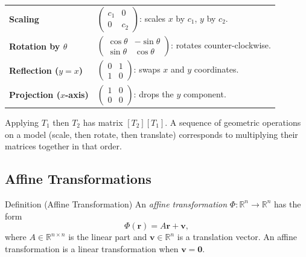 \begin{tcolorbox}[colback=gray!6, colframe=gray!40, arc=2pt,
  left=6pt, right=6pt, top=4pt, bottom=4pt,
  title={\small\textbf{Standard Planar Transformations}},
  fonttitle=\small\bfseries]
\begin{tabular}{@{}p{}p{}@{}}
\textbf{Scaling}           & $\begin{pmatrix} c_1 & 0 \\ 0 & c_2 \end{pmatrix}$: scales $x$ by $c_1$, $y$ by $c_2$. \\[8pt]
\textbf{Rotation by $\theta$} & $\begin{pmatrix} \cos\theta & -\sin\theta \\ \sin\theta & \cos\theta \end{pmatrix}$: rotates counter-clockwise. \\[8pt]
\textbf{Reflection ($y=x$)} & $\begin{pmatrix} 0 & 1 \\ 1 & 0 \end{pmatrix}$: swaps $x$ and $y$ coordinates. \\[8pt]
\textbf{Projection ($x$-axis)} & $\begin{pmatrix} 1 & 0 \\ 0 & 0 \end{pmatrix}$: drops the $y$ component. \\
\end{tabular}
\end{tcolorbox}

\begin{remark*}
Applying $T_1$ then $T_2$ has matrix $[T_2][T_1]$.
A sequence of geometric operations on a model (scale, then rotate, then translate)
corresponds to multiplying their matrices together in that order.
\end{remark*}

\subsection*{Affine Transformations}

\begin{propositionbox}{Definition (Affine Transformation)}
An \emph{affine transformation} $\Phi : \mathbb{R}^n \to \mathbb{R}^n$ has the form
\[
  \Phi(\mathbf{r}) = A\mathbf{r} + \mathbf{v},
\]
where $A \in \mathbb{R}^{n \times n}$ is the linear part and $\mathbf{v} \in \mathbb{R}^n$
is a translation vector.
An affine transformation is a linear transformation when $\mathbf{v} = \mathbf{0}$.
\end{propositionbox}

